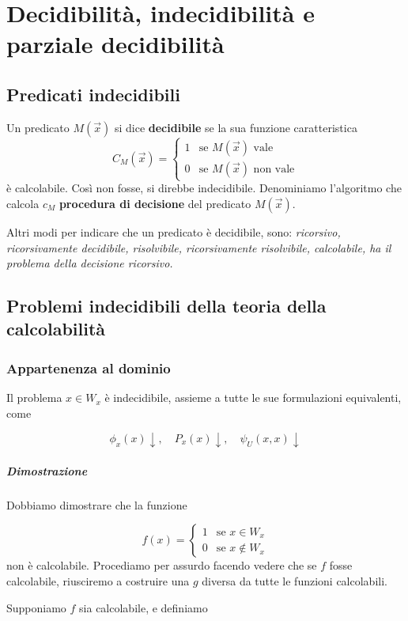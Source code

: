 \chapter{Decidibilità, indecidibilità e parziale decidibilità}

\section{Predicati indecidibili}
Un predicato $M(\vec{x})$ si dice \textbf{decidibile} se la sua funzione caratteristica
$$
C_M(\vec{x}) = \begin{cases}
1 &\text{se $M(\vec{x})$ vale}\\
0 &\text{se $M(\vec{x})$ non vale} 
\end{cases}
$$
%
è calcolabile. Così non fosse, si direbbe indecidibile. Denominiamo l'algoritmo che calcola $c_M$ \textbf{procedura di decisione} del predicato $M(\vec{x})$. 

Altri modi per indicare che un predicato è decidibile, sono:
\it ricorsivo, ricorsivamente decidibile, risolvibile, ricorsivamente risolvibile, calcolabile, ha il problema della decisione ricorsivo\rm.

\section{Problemi indecidibili della teoria della calcolabilità}
\subsection{Appartenenza al dominio}
Il problema $x \in W_x$ è indecidibile, assieme a tutte le sue formulazioni equivalenti, come

$$
\phi_x(x)\downarrow,\quad P_x(x)\downarrow,\quad \psi_U(x,x)\downarrow
$$

\paragraph{Dimostrazione}
Dobbiamo dimostrare che la funzione

$$
f(x) = \begin{cases}
	1 &\text{se $x \in W_x$}\\
	0 &\text{se $x \notin W_x$} 
\end{cases}
$$
%
non è calcolabile. Procediamo per assurdo facendo vedere che se $f$ fosse calcolabile, riusciremo a costruire una $g$ diversa da tutte le funzioni calcolabili.

Supponiamo $f$ sia calcolabile, e definiamo

